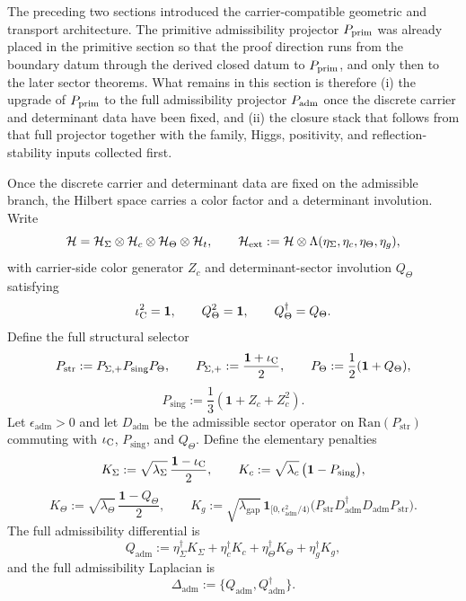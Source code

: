 The preceding two sections introduced the carrier-compatible geometric and transport architecture.
The primitive admissibility projector $P_{\mathrm{prim}}$ was already placed in the primitive section so
that the proof direction runs from the boundary datum through the derived closed datum to $P_{\mathrm{prim}}$, and only then to the later
sector theorems. What remains in this section is therefore (i) the upgrade of $P_{\mathrm{prim}}$ to the
full admissibility projector $P_{\mathrm{adm}}$ once the discrete carrier and determinant data have been
fixed, and (ii) the closure stack that follows from that full projector together with the family,
Higgs, positivity, and reflection-stability inputs collected first.

\begin{definition}
\label{def:full-admissibility-complex}
Once the discrete carrier and determinant data are fixed on the admissible branch, the Hilbert
space carries a color factor and a determinant involution. Write
\[
\mathcal H=\mathcal H_{\Sigma}\otimes\mathcal H_c\otimes\mathcal H_\Theta\otimes\mathcal H_t,
\qquad
\mathcal H_{\mathrm{ext}}
:=
\mathcal H\otimes\Lambda(\eta_\Sigma,\eta_c,\eta_\Theta,\eta_g),
\]
with carrier-side color generator $Z_c$ and determinant-sector involution $Q_\Theta$ satisfying
\[
\iota_{\mathrm C}^2=\mathbf 1,
\qquad
Q_\Theta^2=\mathbf 1,
\qquad
Q_\Theta^\dagger=Q_\Theta.
\]
Define the full structural selector
\[
P_{\mathrm{str}}:=P_{\Sigma,+}P_{\mathrm{sing}}P_\Theta,
\qquad
P_{\Sigma,+}:=\frac{\mathbf 1+\iota_{\mathrm C}}{2},
\qquad
P_\Theta:=\frac12(\mathbf 1+Q_\Theta),
\]
\[
P_{\mathrm{sing}}:=\frac13(\mathbf 1+Z_c+Z_c^2).
\]
Let $\epsilon_{\mathrm{adm}}>0$ and let $D_{\mathrm{adm}}$ be the admissible sector operator on
$\mathrm{Ran}(P_{\mathrm{str}})$ commuting with $\iota_{\mathrm C}$, $P_{\mathrm{sing}}$, and $Q_\Theta$.
Define the elementary penalties
\[
K_\Sigma:=\sqrt{\lambda_\Sigma}\,\frac{\mathbf 1-\iota_{\mathrm C}}{2},
\qquad
K_c:=\sqrt{\lambda_c}\,\bigl(\mathbf 1-P_{\mathrm{sing}}\bigr),
\]
\[
K_\Theta:=\sqrt{\lambda_\Theta}\,\frac{\mathbf 1-Q_\Theta}{2},
\qquad
K_g:=\sqrt{\lambda_{\mathrm{gap}}}\,\mathbf 1_{[0,\epsilon_{\mathrm{adm}}^2/4)}\!\bigl(P_{\mathrm{str}}D_{\mathrm{adm}}^\dagger D_{\mathrm{adm}}P_{\mathrm{str}}\bigr).
\]
The full admissibility differential is
\[
Q_{\mathrm{adm}}
:=
\eta_\Sigma^\dagger K_\Sigma
+\eta_c^\dagger K_c
+\eta_\Theta^\dagger K_\Theta
+\eta_g^\dagger K_g,
\]
and the full admissibility Laplacian is
\[
\Delta_{\mathrm{adm}}:=\{Q_{\mathrm{adm}},Q_{\mathrm{adm}}^\dagger\}.
\]
\end{definition}

